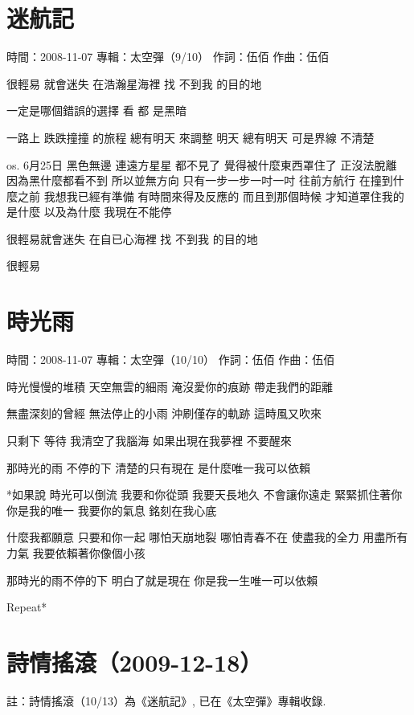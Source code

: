 \documentclass[UTF8,a4paper,oneside,twocolumn,12pt]{ctexbook}
\newcommand{\infopair}[2]{\textbullet #1：#2}
\newcommand{\zc}[1][伍佰]{\infopair{作詞}{#1}}
\newcommand{\zq}[1][伍佰]{\infopair{作曲}{#1}}
\newcommand{\zj}[1]{\infopair{專輯}{#1}}
\newcommand{\sj}[1]{\infopair{時間}{#1}}
\newenvironment{info}{\begin{flushleft}\kaishu
	}
	{\end{flushleft}\normalsize\yahei\par}
\newenvironment{lyric}{
	}
{}
\begin{document}
\section{迷航記}
\begin{info}
	\sj{2008-11-07}
	\zj{太空彈（9/10）}
	\zc
	\zq
\end{info}
\begin{lyric}
	很輕易 就會迷失 在浩瀚星海裡
	找 不到我 的目的地

	一定是哪個錯誤的選擇
	看 都 是黑暗

	一路上 跌跌撞撞 的旅程
	總有明天 來調整
	明天 總有明天
	可是界線 不清楚

	os.
	6月25日
	黑色無邊
	連遠方星星
	都不見了
	覺得被什麼東西罩住了
	正沒法脫離
	因為黑什麼都看不到
	所以並無方向
	只有一步一步一吋一吋
	往前方航行
	在撞到什麼之前
	我想我已經有準備
	有時間來得及反應的
	而且到那個時候
	才知道罩住我的是什麼
	以及為什麼
	我現在不能停

	很輕易就會迷失
	在自已心海裡
	找 不到我 的目的地

	很輕易
\end{lyric}

\section{時光雨}
\begin{info}
	\sj{2008-11-07}
	\zj{太空彈（10/10）}
	\zc
	\zq
\end{info}
\begin{lyric}
	時光慢慢的堆積
	天空無雲的細雨
	淹沒愛你的痕跡
	帶走我們的距離

	無盡深刻的曾經
	無法停止的小雨
	沖刷僅存的軌跡
	這時風又吹來

	只剩下 等待
	我清空了我腦海
	如果出現在我夢裡
	不要醒來

	那時光的雨 不停的下
	清楚的只有現在
	是什麼唯一我可以依賴

	*如果說
	時光可以倒流
	我要和你從頭
	我要天長地久
	不會讓你遠走
	緊緊抓住著你
	你是我的唯一
	我要你的氣息
	銘刻在我心底

	什麼我都願意
	只要和你一起
	哪怕天崩地裂
	哪怕青春不在
	使盡我的全力
	用盡所有力氣
	我要依賴著你像個小孩

	那時光的雨不停的下
	明白了就是現在
	你是我一生唯一可以依賴

	Repeat*
\end{lyric}

\section*{詩情搖滾（2009-12-18）}
註：詩情搖滾（10/13）為《迷航記》, 已在《太空彈》專輯收錄.
\end{document}
